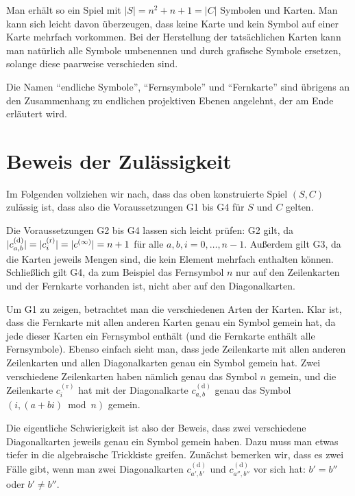 \documentclass[paper=81mm:81mm,fontsize=10.7pt]{scrartcl}
\begin{document}
Man erhält so ein Spiel mit $|S| = n^2 + n + 1 = |C|$ Symbolen und Karten.
Man kann sich leicht davon überzeugen, dass keine Karte und
kein Symbol auf einer Karte mehrfach vorkommen.
Bei der Herstellung der tatsächlichen Karten kann man natürlich alle Symbole umbenennen
und durch grafische Symbole ersetzen, solange diese paarweise verschieden sind.

Die Namen "`endliche Symbole"', "`Fernsymbole"' und "`Fernkarte"'
sind übrigens an den Zusammenhang zu endlichen projektiven Ebenen angelehnt,
der am Ende erläutert wird.

\section*{Beweis der Zulässigkeit}

Im Folgenden vollziehen wir nach, dass das oben konstruierte Spiel $(S, C)$ zulässig ist,
dass also die Voraussetzungen G1 bis G4 für $S$ und $C$ gelten.

Die Voraussetzungen G2 bis G4 lassen sich leicht prüfen:
G2 gilt, da $|c^\mathrm{(d)}_{a,b}| = |\smash{c^\mathrm{(r)}_i}| = |c^{(\infty)}| = n + 1$
für alle $a, b, i = 0, \dotsc, n - 1$.
Außerdem gilt G3, da die Karten jeweils Mengen sind, die kein Element mehrfach enthalten können.
Schließlich gilt G4, da zum Beispiel das Fernsymbol $n$ nur auf den Zeilenkarten und
der Fernkarte vorhanden ist, nicht aber auf den Diagonalkarten.

Um G1 zu zeigen, betrachtet man die verschiedenen Arten der Karten.
Klar ist, dass die Fernkarte mit allen anderen Karten genau ein Symbol gemein hat,
da jede dieser Karten ein Fernsymbol enthält (und die Fernkarte enthält alle Fernsymbole).
Ebenso einfach sieht man, dass jede Zeilenkarte mit allen anderen Zeilenkarten und
allen Diagonalkarten genau ein Symbol gemein hat.
Zwei verschiedene Zeilenkarten haben nämlich genau das Symbol $n$ gemein, und\vspace{-0.1em}
die Zeilenkarte $c^\mathrm{(r)}_i$ hat mit der Diagonalkarte $c^\mathrm{(d)}_{a,b}$
genau das Symbol $(i, (a + bi) \bmod n)$ gemein.

Die eigentliche Schwierigkeit ist also der Beweis,
dass zwei verschiedene Diagonalkarten jeweils genau ein Symbol gemein haben.
Dazu muss man etwas tiefer in die algebraische Trickkiste greifen.
Zunächst bemerken wir, dass es zwei Fälle gibt,
wenn man zwei Diagonalkarten $c^\mathrm{(d)}_{a',b'}$ und $c^\mathrm{(d)}_{a'',b''}$ vor sich hat:
\vspace{-0.1em}$b' = b''$ oder $b' \not= b''$.
\end{document}
